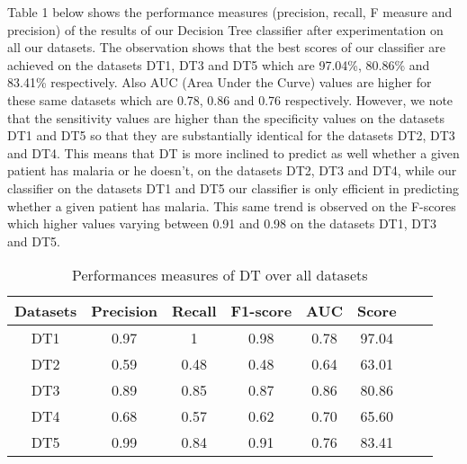 Table 1  below shows the performance measures (precision, recall, F measure and precision) of the results of our Decision Tree classifier after experimentation on all our datasets. The observation shows that the best scores of our classifier are achieved on the datasets DT1, DT3 and DT5 which are 97.04\%, 80.86\% and 83.41\% respectively. Also AUC (Area Under the Curve) values are higher for these same datasets which are 0.78, 0.86 and 0.76 respectively. However, we note that the sensitivity values are higher than the specificity values on the datasets DT1 and DT5 so that they are substantially identical for the datasets DT2, DT3 and DT4. This means that DT is more inclined to predict as well whether a given patient has malaria or he doesn’t, on the datasets DT2, DT3 and DT4, while our classifier on the datasets DT1 and DT5 our classifier is only efficient in predicting whether a given patient has malaria. This same trend is observed on the F-scores which higher values varying between 0.91 and 0.98 on the datasets DT1, DT3 and DT5.

\begin{table}[!ht]
\centering
\begin{tabular}{*{6}{c}l r}
  \toprule
  \textbf{Datasets} & \textbf{Precision} & \textbf{Recall} & \textbf{F1-score}&\textbf{AUC} &\textbf{Score}\\
   \midrule
  DT1 &0.97 & 1  & 0.98& 0.78&97.04 \\
  DT2 & 0.59 &0.48&0.48&0.64&63.01 \\
  DT3 &0.89 &0.85 &0.87&0.86&80.86\\
  DT4 &0.68 &0.57&0.62&0.70&65.60\\
  DT5 &0.99 &0.84&0.91&0.76&83.41\\

  
    \bottomrule
\end{tabular}
\caption{Performances measures of DT over all datasets}\label{perf-measure-dt1}
\end{table}
